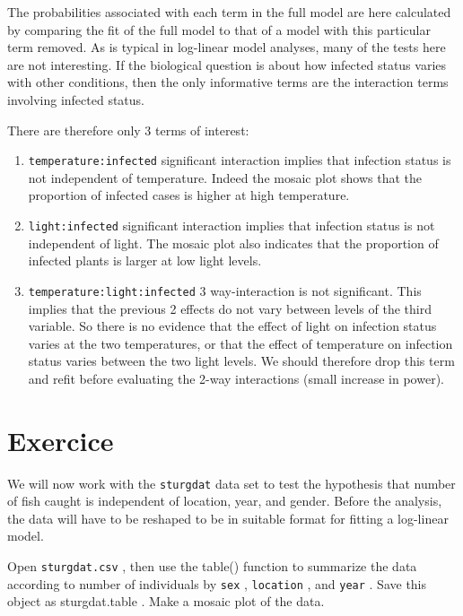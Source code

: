 \documentclass[
  12pt,
]{book}
\makeatletter
\providecommand{\tightlist}{%
  \setlength{\itemsep}{0pt}\setlength{\parskip}{0pt}}
\newenvironment{kframe}{%
\medskip{}
\setlength{\fboxsep}{.8em}
\def\at@end@of@kframe{}%
\ifinner\ifhmode%
 \def\at@end@of@kframe{\end{minipage}}%
 \begin{minipage}{\columnwidth}%
\fi\fi%
\def\FrameCommand##1{\hskip\@totalleftmargin \hskip-\fboxsep
\colorbox{incolor}{##1}\hskip-\fboxsep
    \hskip-\linewidth \hskip-\@totalleftmargin \hskip\columnwidth}%
\MakeFramed {\advance\hsize-\width
  \@totalleftmargin\z@ \linewidth\hsize
  \@setminipage}}%
{\par\unskip\endMakeFramed%
\at@end@of@kframe}
\newenvironment{rmdblock}[1]
 {
 \begin{itemize}
 \renewcommand{\labelitemi}{
   \raisebox{-.7\height}[0pt][0pt]{
     {\setkeys{Gin}{width=3em,keepaspectratio}\texttt{[image: images/\#1]}}
   }
 }
 \begin{kframe}
 \setlength{\fboxsep}{1em}
 \item
 }
 {
 \end{kframe}
 \end{itemize}
 }
\newenvironment{rmdcode}
  {\begin{rmdblock}{screen}}
  {\end{rmdblock}}
\makeatother
\begin{document}
The probabilities associated with each term in the full model are here calculated by comparing the fit of the full model to that of a model with this particular term removed. As is typical in log-linear model analyses, many of the tests here are not interesting. If the biological question is about how infected status varies with other conditions, then the only informative terms are the interaction terms involving infected status.

There are therefore only 3 terms of interest:

\begin{enumerate}
\def\labelenumi{\arabic{enumi}.}
\tightlist
\item
  \texttt{temperature:infected} significant interaction implies that infection status is not independent of temperature. Indeed the mosaic plot shows that the proportion of infected cases is higher at high temperature.
\item
  \texttt{light:infected} significant interaction implies that infection status is not independent of light. The mosaic plot also indicates that the proportion of infected plants is larger at low light levels.
\item
  \texttt{temperature:light:infected} 3 way-interaction is not significant. This implies that the previous 2 effects do not vary between levels of the third variable. So there is no evidence that the effect of light on infection status varies at the two temperatures, or that the effect of temperature on infection status varies between the two light levels. We should therefore drop this term and refit before evaluating the 2-way interactions (small increase in power).
\end{enumerate}

\hypertarget{ex-glm}{%
\section{Exercice}\label{ex-glm}}

We will now work with the \texttt{sturgdat} data set to test the hypothesis that number of fish caught is independent of location, year, and gender. Before the analysis, the data will have to be reshaped to be in suitable format for fitting a log-linear model.

\begin{rmdcode}
Open \texttt{sturgdat.csv} , then use the table() function to summarize the data according to number of individuals by \texttt{sex} , \texttt{location} , and \texttt{year} . Save this object as sturgdat.table . Make a mosaic plot of the data.
\end{rmdcode}
\end{document}
